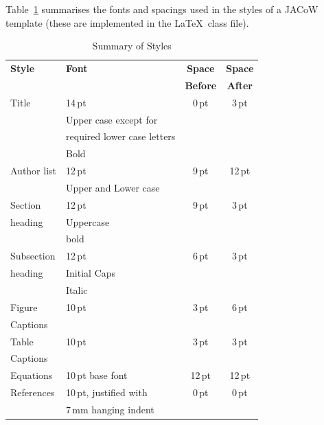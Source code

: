 \documentclass{JAC2003}
\begin{document}
Table~\ref{style-tab} summarises the fonts and spacings used in the styles of
a JACoW template (these are implemented in the \LaTeX\ class file).

\begin{table}
    \setlength\tabcolsep{4pt}
    \caption{Summary of Styles}
    \label{style-tab}
    \begin{tabular}{llcc}
        \toprule
        \textbf{Style} & \textbf{Font}               & \textbf{Space}  & \textbf{Space} \\
                       &                             & \textbf{Before} & \textbf{After} \\ 
        \midrule
         Title         & 14\,pt                      & 0\,pt           & 3\,pt  \\
                       & Upper case except for       &                 &      \\
                       & required lower case letters &                 &      \\   %
                       & Bold                        &                 &      \\ 
         \midrule
          Author list  & 12\,pt                      & 9\,pt           & 12\,pt \\
                       & Upper and Lower case        &                 &      \\ 
         \midrule
         Section       & 12\,pt                      & 9\,pt           & 3\,pt  \\
         heading       & Uppercase                   &                 &      \\
                       & bold                        &                 &      \\ 
        \midrule
         Subsection    & 12\,pt                      & 6\,pt           & 3\,pt  \\
         heading       & Initial Caps                &                 &      \\
                       & Italic                      &                 &      \\ 
        \midrule
         Figure        & 10\,pt                      & 3\,pt           & 6\,pt  \\
         Captions      &                             &                 &      \\
        \midrule
         Table         & 10\,pt                      & 3\,pt           & 3\,pt  \\
         Captions      &                             &                 &      \\
        \midrule
         Equations     & 10\,pt base font            & 12\,pt          & 12\,pt \\
        \midrule
         References    & 10\,pt, justified with      & 0\,pt           & 0\,pt  \\
                       & 7\,mm hanging indent          &                 &      \\
        \bottomrule
    \end{tabular}
\end{table}
\end{document}
